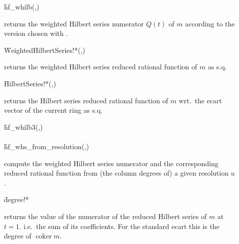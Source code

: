 \begin{description}

\item[]
  \begin{syntax}
    \f{hf\_whilb}(,)
  \end{syntax}
  \hypertarget{procedure:HF_WHILB}{}
returns the weighted Hilbert series numerator $Q(t)$ of $m$
according to the version chosen with .

\item[]
  \begin{syntax}
    \f{WeightedHilbertSeries!*}(,)
  \end{syntax}
  \hypertarget{procedure:WEIGHTEDHILBERTSERIES!*}{}
returns the weighted Hilbert series reduced rational function of
$m$ as s.q.

\item[]
  \begin{syntax}
    \f{HilbertSeries!*}(,)
  \end{syntax}
  \hypertarget{procedure:HILBERTSERIES!*}{}
returns the Hilbert series reduced rational function of $m$ wrt.\
the ecart vector of the current ring as s.q.

\item[]
  \begin{syntaxtable}
    \f{hf\_whilb3}(,)\\
    \\
    \f{hf\_whs\_from\_resolution}(,)\\
  \end{syntaxtable}
  \hypertarget{procedure:HF_WHILB3}{}
  \hypertarget{procedure:HF_WHS_FROM_RESOLUTION}{}
compute the weighted Hilbert series numerator and the
corresponding reduced rational function from (the column degrees of) a
given resolution $u$.

\item[]
  \begin{syntax}
    \f{degree!*} 
  \end{syntax}
  \hypertarget{procedure:DEGREE!*}{}
returns the value of the numerator of the reduced Hilbert series
of $m$ at $t=1$. i.e.\ the sum of its coefficients. For the standard
ecart this is the degree of $\mathop{\mathrm{coker}} m$.
\end{description}

